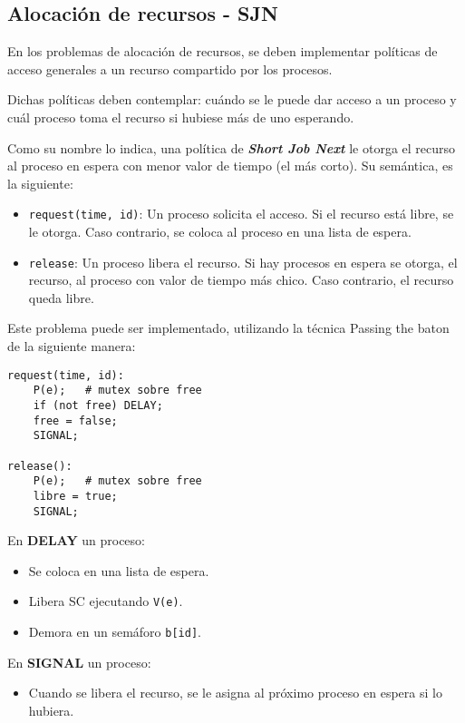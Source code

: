 \documentclass[a4paper, 10pt]{report}
\begin{document}
\subsection{Alocación de recursos - SJN}

En los problemas de alocación de recursos, se deben implementar políticas de acceso generales a un recurso compartido por los procesos.

Dichas políticas deben contemplar: cuándo se le puede dar acceso a un proceso y cuál proceso toma el recurso si hubiese más de uno esperando.

Como su nombre lo indica, una política de \textbf{\emph{Short Job Next}} le otorga el recurso al proceso en espera con menor valor de tiempo (el más corto). Su semántica, es la siguiente:

\begin{itemize}
	\item \lstinline{request(time, id)}: Un proceso solicita el acceso. Si el recurso está libre, se le otorga. Caso contrario, se coloca al proceso en una lista de espera.
	\item \lstinline{release}: Un proceso libera el recurso. Si hay procesos en espera se otorga, el recurso, al proceso con valor de tiempo más chico. Caso contrario, el recurso queda libre.
\end{itemize}

Este problema puede ser implementado, utilizando la técnica Passing the baton de la siguiente manera:

\noindent
\begin{minipage}{0.5\textwidth}
\begin{lstlisting}
request(time, id):
	P(e);   # mutex sobre free
	if (not free) DELAY;
	free = false;
	SIGNAL;

release():
	P(e);   # mutex sobre free
	libre = true;
	SIGNAL;
\end{lstlisting}
\end{minipage}
\begin{minipage}{0.5\textwidth}
En \textbf{DELAY} un proceso:
\begin{itemize}
	\item Se coloca en una lista de espera.
	\item Libera SC ejecutando \lstinline{V(e)}.
	\item Demora en un semáforo \lstinline{b[id]}.
\end{itemize}

En \textbf{SIGNAL} un proceso:
\begin{itemize}
	\item Cuando se libera el recurso, se le asigna al próximo proceso en espera si lo hubiera.
\end{itemize}
\end{minipage}
\end{document}

